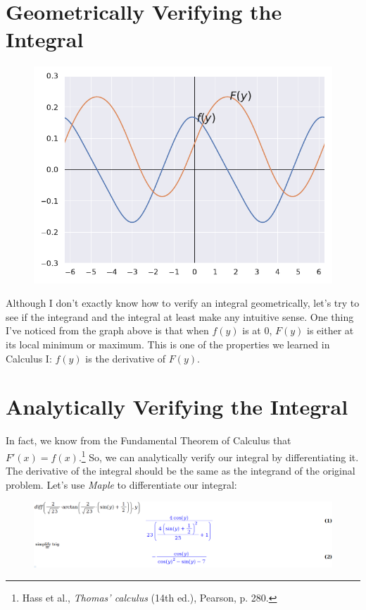 \section*{Geometrically Verifying the Integral}

\begin{figure}
	\centering
	\caption[Figure 1. The integrand and the integral.]{}
	\includegraphics[width=0.7\linewidth]{graph_1}
	\label{fig:graph1}
\end{figure}

Although I don't exactly know how to
verify an integral geometrically, let's
try to see if the integrand and the integral
at least make any intuitive sense. One thing I've noticed
from the graph above is that when $ f(y) $ is at $ 0 $, 
$ F(y) $ is either at its local minimum or maximum.
This is one of the properties we learned
in Calculus I: $ f(y) $ is the
derivative of $ F(y) $.

\newpage

\section*{Analytically Verifying the Integral}

In fact, we know from the Fundamental Theorem of Calculus
that $ F\prime(x) = f(x) $.\footnote{
	Hass et al., \textit{Thomas' calculus} (14th ed.), Pearson, p. 280.
} So, we can analytically verify our integral by differentiating it. 
The derivative of the integral should be the same as 
the integrand of the original problem. Let's use \textit{Maple} to
differentiate our integral: 
\begin{figure}
	\centering
	\includegraphics[width=0.98\linewidth]{maple}
	\caption{}
	\label{fig:maple}
\end{figure}

